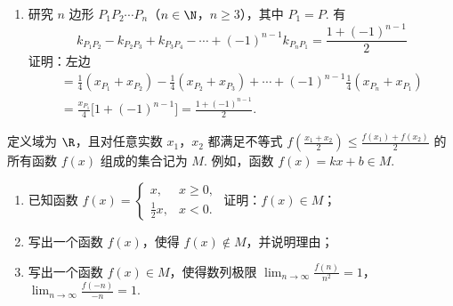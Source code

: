 \begin{solution}
\begin{enumerate}
\begin{enumerate}
\item 研究 \(n\) 边形 \(P_1P_2\cdots P_n\)（\(n\in\N\)，\(n\ge3\)），其中 \(P_1=P\). 有
\[
k_{P_1P_2}-k_{P_2P_3}+k_{P_3P_4}-\cdots+(-1)^{n-1}k_{P_nP_1}=\frac{1+(-1)^{n-1}}{2}
\]
证明：左边
\[
\begin{gathered}
=\frac{1}{4}(x_{P_1}+x_{P_2})-\frac{1}{4}(x_{P_2}+x_{P_3})+\cdots+(-1)^{n-1}\frac{1}{4}(x_{P_n}+x_{P_1}) \\
=\frac{x_{P_1}}{4}\bigl[1+(-1)^{n-1}\bigr]=\frac{1+(-1)^{n-1}}{2}.
\end{gathered}
\]
\end{enumerate}
\end{enumerate}
\end{solution}

\begin{problem}
定义域为 \(\R\)，且对任意实数 \(x_{1}\)，\(x_{2}\) 都满足不等式 \(f\left(\frac{x_{1} + x_{2}}{2}\right) \leqslant \frac{f(x_{1}) + f(x_{2})}{2}\) 的所有函数 \(f(x)\) 组成的集合记为 \(M\). 例如，函数 \(f(x) = kx + b \in M\).
\begin{enumerate}
\item 已知函数 \( f(x) = \begin{cases}
x, & x \geqslant 0,\\
\frac{1}{2} x, & x < 0.
\end{cases}\) 证明：\(f(x)\in M\)；
\item 写出一个函数 \(f(x)\)，使得 \(f(x)\notin M\)，并说明理由；
\item 写出一个函数 \(f(x)\in M\)，使得数列极限 \(\displaystyle\lim_{n\to\infty}\frac{f(n)}{n^2}=1\)，\(\displaystyle\lim_{n\to\infty}\frac{f(-n)}{-n}=1\).
\end{enumerate}
\end{problem}

